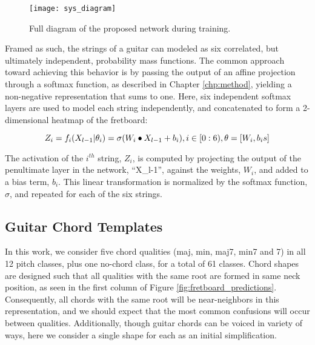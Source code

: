 \begin{figure}[t!]
  \centering
  \centerline{\texttt{[image: sys\_diagram]}}
\caption{Full diagram of the proposed network during training.}
\label{fig:sys_diagram}
%
\end{figure}

Framed as such, the strings of a guitar can modeled as six correlated, but ultimately independent, probability mass functions.
The common approach toward achieving this behavior is by passing the output of an affine projection through a softmax function, as described in Chapter \ref{chp:method}, yielding a non-negative representation that sums to one.
Here, six independent softmax layers are used to model each string independently, and concatenated to form a 2-dimensional heatmap of the fretboard:

\begin{equation}
\label{eq:softmax_layer}
\small
Z_i = f_i(X_{l-1} \vert \theta_i) = \sigma (W_i \bullet X_{l-1} + b_i), i \in [0:6), \theta = [W_i, b_is]
\end{equation}

\noindent The activation of the $i^{th}$ string, $Z_i$, is computed by projecting the output of the penultimate layer in the network, ``X_{l-1}'', against the weights, $W_i$, and added to a bias term, $b_i$.
This linear transformation is normalized by the softmax function, $\sigma$, and repeated for each of the six strings.



\subsection{Guitar Chord Templates}
\label{subsec:vocabulary}

In this work, we consider five chord qualities (maj, min, maj7, min7 and 7) in all 12 pitch classes, plus one no-chord class, for a total of 61 classes.
Chord shapes are designed such that all qualities with the same root are formed in same neck position, as seen in the first column of Figure \ref{fig:fretboard_predictions}.
Consequently, all chords with the same root will be near-neighbors in this representation, and we should expect that the most common confusions will occur between qualities.
Additionally, though guitar chords can be voiced in variety of ways, here we consider a single shape for each as an initial simplification.

